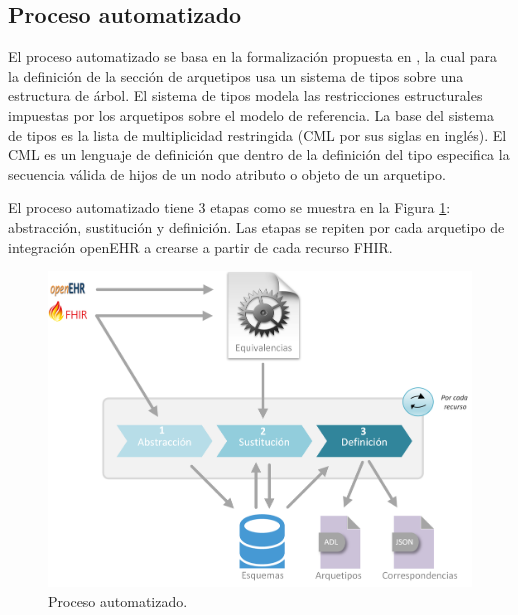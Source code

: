 \subsection{Proceso automatizado}

El proceso automatizado se basa en la formalización propuesta en \cite{Maldonado09}, la cual para la definición de la sección de arquetipos usa un sistema de tipos sobre una estructura de árbol. El sistema de tipos modela las restricciones estructurales impuestas por los arquetipos sobre el modelo de referencia. La base del sistema de tipos es la lista de multiplicidad restringida (CML por sus siglas en inglés). El CML es un lenguaje de definición que dentro de la definición del tipo especifica la secuencia válida de hijos de un nodo atributo o objeto de un arquetipo.

El proceso automatizado tiene 3 etapas como se muestra en la Figura \ref{fig:solution}: abstracción, sustitución y definición. Las etapas se repiten por cada arquetipo de integración openEHR a crearse a partir de cada recurso FHIR.

\begin{figure}[h]
  \centering
  \includegraphics[scale=0.5]{./images/solution}
  \caption{Proceso automatizado.}
  \label{fig:solution}
\end{figure}






